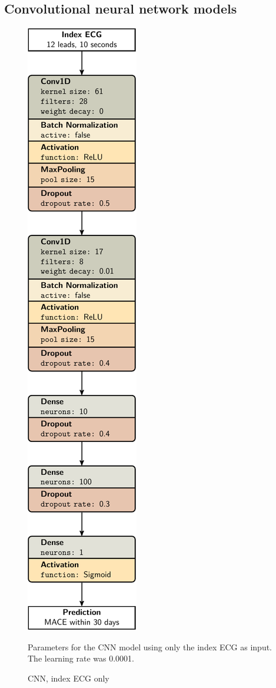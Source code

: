 \documentclass[preprint]{elsarticle}
\begin{document}
\subsection{Convolutional neural network models}
\begin{figure}[H]
\centering
\includegraphics[scale=\modelscale,keepaspectratio]{figures/model-cnn1.pdf}
\caption{CNN, index ECG only}
\medskip
\small
Parameters for the CNN model using only the index ECG as input. The learning rate was 0.0001.
\end{figure}
\end{document}
